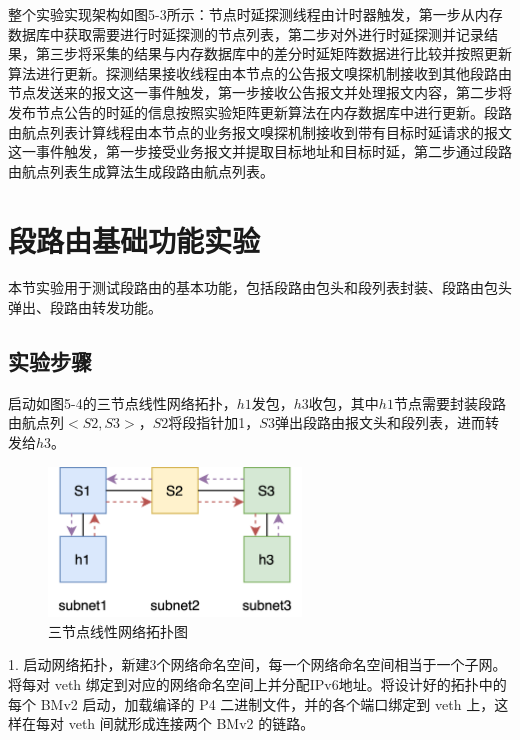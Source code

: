 整个实验实现架构如图5-3所示：节点时延探测线程由计时器触发，第一步从内存数据库中获取需要进行时延探测的节点列表，第二步对外进行时延探测并记录结果，第三步将采集的结果与内存数据库中的差分时延矩阵数据进行比较并按照更新算法进行更新。探测结果接收线程由本节点的公告报文嗅探机制接收到其他段路由节点发送来的报文这一事件触发，第一步接收公告报文并处理报文内容，第二步将发布节点公告的时延的信息按照实验矩阵更新算法在内存数据库中进行更新。段路由航点列表计算线程由本节点的业务报文嗅探机制接收到带有目标时延请求的报文这一事件触发，第一步接受业务报文并提取目标地址和目标时延，第二步通过段路由航点列表生成算法生成段路由航点列表。

\section{段路由基础功能实验}

本节实验用于测试段路由的基本功能，包括段路由包头和段列表封装、段路由包头弹出、段路由转发功能。

\subsection{实验步骤}

启动如图5-4的三节点线性网络拓扑，$h1$发包，$h3$收包，其中$h1$节点需要封装段路由航点列$<S2, S3>$，$S2$将段指针加1，$S3$弹出段路由报文头和段列表，进而转发给$h3$。

\begin{figure}[htbp]
\setlength{\abovecaptionskip}{15pt plus 3pt minus 2pt}
\centerline{\includegraphics[width=0.6\textwidth]{./figures/ch5-three-line-topo.png}}
\caption{三节点线性网络拓扑图}
\label{fig-ch5-three-line-topo}
\end{figure}

1. 启动网络拓扑，新建3个网络命名空间，每一个网络命名空间相当于一个子网。将每对 \gls*{veth} 绑定到对应的网络命名空间上并分配IPv6地址。将设计好的拓扑中的每个 \gls*{BMv2} 启动，加载编译的 \gls*{P4} 二进制文件，并的各个端口绑定到 \gls*{veth} 上，这样在每对 \gls*{veth} 间就形成连接两个 \gls*{BMv2} 的链路。

